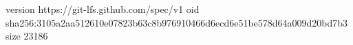 version https://git-lfs.github.com/spec/v1
oid sha256:3105a2aa512610e07823b63c8b976910466d6ecd6e51be578d64a009d20bd7b3
size 23186
